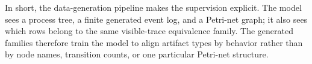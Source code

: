 \documentclass[manuscript,screen,nonacm]{acmart}
\begin{document}
In short, the data-generation pipeline makes the supervision explicit. The
model sees a process tree, a finite generated event log, and a Petri-net graph; it also sees
which rows belong to the same visible-trace equivalence family. The generated
families therefore train the model to align artifact types by behavior rather
than by node names, transition counts, or one particular Petri-net structure.
\end{document}
